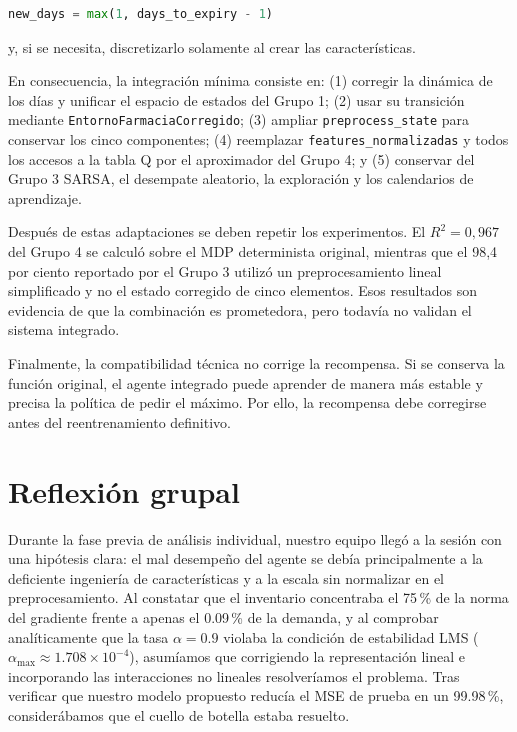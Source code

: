 \documentclass[11pt,letterpaper]{article}
\begin{document}
\begin{lstlisting}[language=Python]
new_days = max(1, days_to_expiry - 1)
\end{lstlisting}

y, si se necesita, discretizarlo solamente al crear las características.

En consecuencia, la integración mínima consiste en: (1) corregir la dinámica de
los días y unificar el espacio de estados del Grupo 1; (2) usar su transición
mediante \texttt{EntornoFarmaciaCorregido}; (3) ampliar
\texttt{preprocess\_state} para conservar los cinco componentes; (4) reemplazar
\texttt{features\_normalizadas} y todos los accesos a la tabla Q por el
aproximador del Grupo 4; y (5) conservar del Grupo 3 SARSA, el desempate
aleatorio, la exploración y los calendarios de aprendizaje.

Después de estas adaptaciones se deben repetir los experimentos. El
$R^2=0{,}967$ del Grupo 4 se calculó sobre el MDP determinista original, mientras
que el 98,4 por ciento reportado por el Grupo 3 utilizó un preprocesamiento lineal
simplificado y no el estado corregido de cinco elementos. Esos resultados son
evidencia de que la combinación es prometedora, pero todavía no validan el
sistema integrado.

Finalmente, la compatibilidad técnica no corrige la recompensa. Si se conserva
la función original, el agente integrado puede aprender de manera más estable y
precisa la política de pedir el máximo. Por ello, la recompensa debe corregirse
antes del reentrenamiento definitivo.

\clearpage
\section{Reflexión grupal}

Durante la fase previa de análisis individual, nuestro equipo llegó a la sesión con una hipótesis clara: el mal desempeño del agente se debía principalmente a la deficiente ingeniería de características y a la escala sin normalizar en el preprocesamiento. Al constatar que el inventario concentraba el 75\,\% de la norma del gradiente frente a apenas el 0.09\,\% de la demanda, y al comprobar analíticamente que la tasa $\alpha = 0.9$ violaba la condición de estabilidad LMS ($\alpha_{\max} \approx 1.708 \times 10^{-4}$), asumíamos que corrigiendo la representación lineal e incorporando las interacciones no lineales resolveríamos el problema. Tras verificar que nuestro modelo propuesto reducía el MSE de prueba en un 99.98\,\%, considerábamos que el cuello de botella estaba resuelto.
\end{document}
